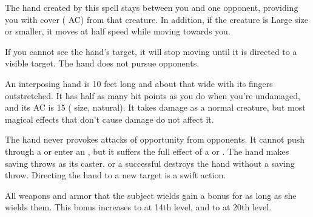 \spellrng{\rngmed}
\begin{spelleffect}
  The hand created by this spell stays between you and one opponent, providing you with cover ( AC) from that creature. In addition, if the creature is Large size or smaller, it moves at half speed while moving towards you. 
  \par If you cannot see the hand's target, it will stop moving until it is directed to a visible target. The hand does not pursue opponents.
  \par An interposing hand is 10 feet long and about that wide with its fingers outstretched. It has half as many hit points as you do when you're undamaged, and its AC is 15 ( size,  natural). It takes damage as a normal creature, but most magical effects that don't cause damage do not affect it.
\end{spelleffect}
\begin{spellnotes}
  \par The hand never provokes attacks of opportunity from opponents. It cannot push through a  or enter an , but it suffers the full effect of a  or . The hand makes saving throws as its caster.
   or a successful  destroys the hand without a saving throw. Directing the hand to a new target is a swift action.
\end{spellnotes}

\spellrng{\rngclose}
\spelldur{\durshort}
\begin{spelleffect}
  All weapons and armor that the subject wields gain a  bonus for as long as she wields them. This bonus increases to  at 14th level, and to  at 20th level.
\end{spelleffect}

